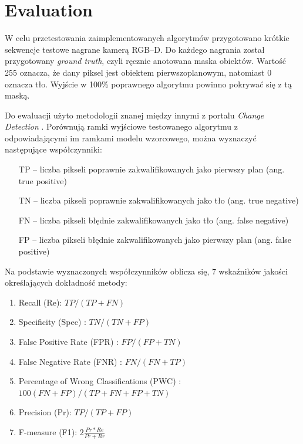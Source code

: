 \documentclass[b5paper,10pt,twoside]{article}
\begin{document}
{\section{Evaluation}

W celu przetestowania zaimplementowanych algorytmów przygotowano krótkie sekwencje testowe nagrane kamerą RGB--D. Do każdego nagrania został przygotowany \textit{ground truth}, czyli ręcznie anotowana maska obiektów. Wartość 255 oznacza, że dany piksel jest obiektem pierwszoplanowym, natomiast 0 oznacza tło. Wyjście w 100\% poprawnego algorytmu powinno pokrywać się z tą maską. 

Do ewaluacji użyto metodologii znanej między innymi z portalu \textit{Change Detection} \cite{}. Porównują ramki wyjściowe testowanego algorytmu z odpowiadającymi im ramkami modelu wzorcowego, można wyznaczyć następujące współczynniki:

\begin{enumerate}
\item[TP] – liczba pikseli poprawnie zakwalifikowanych jako pierwszy plan (ang. true positive)
\item[TN] – liczba pikseli poprawnie zakwalifikowanych jako tło (ang. true negative)
\item[FN] – liczba pikseli błędnie zakwalifikowanych jako tło (ang. false negative)
\item[FP] – liczba pikseli błędnie zakwalifikowanych jako pierwszy plan (ang. false positive)
\end{enumerate}

\noindent Na podstawie wyznaczonych współczynników oblicza się, 7 wskaźników jakości określających dokładność metody:

\begin{enumerate}

\item Recall (Re): $TP/(TP + FN)$
\item Specificity (Spec) : $TN/(TN + FP)$
\item False Positive Rate (FPR) : $FP/(FP + TN)$
\item False Negative Rate (FNR) : $FN/(FN + TP)$
\item Percentage of Wrong Classifications (PWC) : $100(FN + FP)/(TP + FN + FP + TN)$
\item Precision (Pr): $TP/(TP + FP)$
\item F-measure (F1): $2\frac{Pr*Re}{Pr+Rr}$

\end{enumerate}

}
\end{document}
